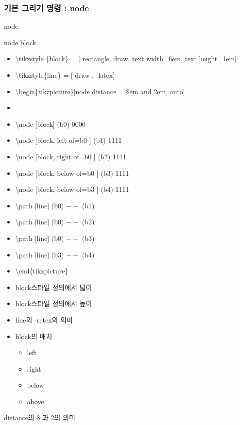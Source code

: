 \documentclass[ aspectratio=169,  12pt,blue,xcolor=pdftex,dvipsnames,table,handout,notes]{beamer}
\begin{document}
		\begin{frame}[t]
		\frametitle{기본 그리기 명령 : node}

			\begin{block}{node}
			\end{block}

			\begin{block}{node block}
			\begin{itemize}
			\item[] 	\textbackslash tikzstyle \{block\} = [ rectangle, draw, text width=6em, text height=1em]
			\item[] 	\textbackslash tikzstyle\{line\} = [ draw , -latex]
			\item[] 	\textbackslash begin\{tikzpicture\}[node distance = 8em and 2em, auto]
			\item[] 	
			\item[] 	\textbackslash node [block] (b0) 				{ 0000 }
			\item[] 	\textbackslash node [block, left of=b0 ] (b1) 	{ 1111 }
			\item[] 	\textbackslash node [block, right of=b0 ] (b2) 	{ 1111 }
			\item[] 	\textbackslash node [block, below of=b0 ] (b3) 	{ 1111 }
			\item[] 	\textbackslash node [block, below of=b3 ] (b4) 	{ 1111 }
			\item[] 	\textbackslash path [line] (b0) $--$ (b1)
			\item[] 	\textbackslash path [line] (b0) $--$ (b2)
			\item[] 	\textbackslash path [line] (b0) $--$ (b3)
			\item[] 	\textbackslash path [line] (b3) $--$ (b4)
			\item[] 	\textbackslash end\{tikzpicture\}

			\end{itemize}
			\end{block}

			\begin{itemize}
			\item block스타일 정의에서 넓이
			\item block스타일 정의에서 높이
			\item line의 -retex의 의미
			\item block의 배치
					\begin{itemize}
					\item left
					\item right
					\item below
					\item above
					\end{itemize}
			\end{itemize}
			distance의 8 과 2의 의미



\end{frame}
\end{document}
